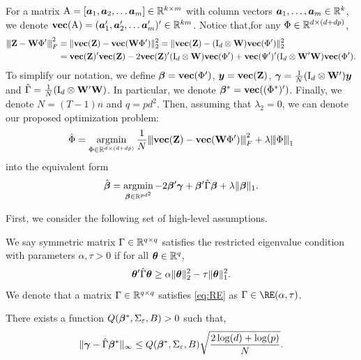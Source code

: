 For a matrix $\mathrm{A} = [\bm{a}_1, \bm{a}_2,\ldots \bm{a}_m] \in \mathbb{R}^{k\times m}$ with column vectors $\bm{a}_1,\ldots,\bm{a}_m\in\mathbb{R}^{k}$, we denote $\textbf{vec}( \mathrm{A}) = (\bm{a}_1', \bm{a}_2',\ldots \bm{a}_m')'\in\mathbb{R}^{km}$. Notice that,for any $\Phi \in \mathbb{R}^{d \times (d+dp)}$,
\begin{align*}
    {\left\vert\kern-0.25ex\left\vert\kern-0.25ex\left\vert \mathbf{Z}- \mathbf{W}\Phi' \right\vert\kern-0.25ex\right\vert\kern-0.25ex\right\vert}_F^2 &= \| \textbf{vec}(\mathbf{Z}) - \textbf{vec}(\mathbf{W}\Phi') \|_2^2 = \|  \textbf{vec}(\mathbf{Z}) - (\mathrm{I}_d \otimes \mathbf{W})\textbf{vec}(\Phi')\|_2^2\\
    &= \textbf{vec}(\mathbf{Z})' \textbf{vec}(\mathbf{Z})  - 2 \textbf{vec}(\mathbf{Z})' (\mathrm{I}_d \otimes \mathbf{W})\textbf{vec}(\Phi') +   \textbf{vec}(\Psi')'(\mathrm{I}_d \otimes \mathbf{W}'\mathbf{W})\textbf{vec}(\Phi').
\end{align*}
To simplify our notation, we define $\bm{\beta} = \textbf{vec}(\Phi')$, $\bm{y} = \textbf{vec}(\mathbf{Z})$, $\bm{\gamma} = \frac{1}{N} (\mathrm{I}_d \otimes \mathbf{W}')\bm{y} $ and $\hat\Gamma = \frac{1}{N} (\mathrm{I}_d \otimes \mathbf{W}' \mathbf{W})$. In particular, we denote $\bm{\beta}^* =\textbf{vec}((\Phi^*)')$. Finally, we denote $N = (T-1)n$ and $q = pd^2$. Then, assuming that $\lambda_2 = 0$, we can denote our proposed optimization problem:
\begin{equation}\label{eq:modvar_lasso_mat}
    \hat\Phi = \mathop{\mathrm{argmin}}_{\Phi\in \mathbb{R}^{d\times (d+dp)}} \frac{1}{N} {\left\vert\kern-0.25ex\left\vert\kern-0.25ex\left\vert  \textbf{vec}(\mathbf{Z}) - \textbf{vec}(\mathbf{W}\Phi') \right\vert\kern-0.25ex\right\vert\kern-0.25ex\right\vert}_F^2 + \lambda {\left\vert\kern-0.25ex\left\vert\kern-0.25ex\left\vert \Phi \right\vert\kern-0.25ex\right\vert\kern-0.25ex\right\vert}_1
\end{equation}
into the equivalent form 
\begin{equation}\label{eq:modvar_lasso_vectorized}
    \hat{\bm{\beta}} = \mathop{\mathrm{argmin}}_{\bm{\beta} \in \mathbb{R}^{pd^2}} -2\bm{\beta} ' \bm{\gamma} + \bm{\beta}' \hat\Gamma\bm{\beta} + \lambda \|\bm{\beta}\|_1.
\end{equation}

First, we consider the following set of high-level assumptions. 

\begin{definition}
    We say symmetric matrix $\Gamma\in\mathbb{R}^{q\times q}$ satisfies the restricted eigenvalue condition with parameters $\alpha,\tau > 0$ if for all $\bm{\theta}\in\mathbb{R}^q$, 
    \begin{equation}\label{eq:RE}
        \bm{\theta}' \hat\Gamma\bm{\theta} \geq \alpha \|\bm{\theta}\|_2^2 - \tau \|\bm{\theta}\|_1^2.
    \end{equation}
    We denote that a matrix $\Gamma\in\mathbb{R}^{q\times q}$ satisfies \eqref{eq:RE} as $\Gamma\in \RE(\alpha,\tau)$.
\end{definition}

\begin{assumption}\label{as:error_bound}
    There exists a function $Q(\bm{\beta}^*, \Sigma_\varepsilon,B) >0$ such that,
    \begin{align*}
        \| \bm{\gamma} - \hat\Gamma \bm{\beta}^* \|_\infty \leq Q(\bm{\beta}^*, \Sigma_\varepsilon,B) \sqrt{\frac{2\log(d) + \log(p)}{N}}.
    \end{align*}
\end{assumption}


